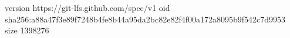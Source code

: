 version https://git-lfs.github.com/spec/v1
oid sha256:a88a47f3e89f7248b4fe8b44a95da2bc82e82f4f00a172a8095b9f542c7d9953
size 1398276
